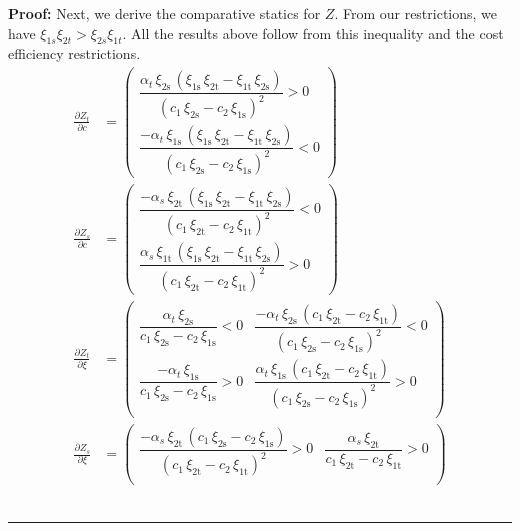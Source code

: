 \documentclass[11pt,a4paper,leqno]{extarticle}
\newenvironment{proof}[1][Proof]{\noindent\textbf{#1:} }{\ \rule{0.5em}{0.5em}}
\begin{document}
\begin{proof}
		Next, we derive the comparative statics for $Z$. From our restrictions, we have $\xi_{1s}\xi_{2t} > \xi_{2s}\xi_{1t}$. All the results above follow from this inequality and the cost efficiency restrictions. 
		\begin{align*}
		\frac{\partial Z_t}{\partial c} &= 
		\begin{pmatrix}
		\dfrac{\alpha _{t}\,\xi _{\mathrm{2s}}\,\left(\xi _{\mathrm{1s}}\,\xi _{\mathrm{2t}}-\xi _{\mathrm{1t}}\,\xi _{\mathrm{2s}}\right)}{{\left(c_{1}\,\xi _{\mathrm{2s}}-c_{2}\,\xi _{\mathrm{1s}}\right)}^2}>0\\
		\dfrac{-\alpha _{t}\,\xi _{\mathrm{1s}}\,\left(\xi _{\mathrm{1s}}\,\xi _{\mathrm{2t}}-\xi _{\mathrm{1t}}\,\xi _{\mathrm{2s}}\right)}{{\left(c_{1}\,\xi _{\mathrm{2s}}-c_{2}\,\xi _{\mathrm{1s}}\right)}^2}<0
		\end{pmatrix}\\
		\frac{\partial Z_s}{\partial c} &= 
		\begin{pmatrix}
		\dfrac{-\alpha _{s}\,\xi _{\mathrm{2t}}\,\left(\xi _{\mathrm{1s}}\,\xi _{\mathrm{2t}}-\xi _{\mathrm{1t}}\,\xi _{\mathrm{2s}}\right)}{{\left(c_{1}\,\xi _{\mathrm{2t}}-c_{2}\,\xi _{\mathrm{1t}}\right)}^2} <0\\
		\dfrac{\alpha _{s}\,\xi _{\mathrm{1t}}\,\left(\xi _{\mathrm{1s}}\,\xi _{\mathrm{2t}}-\xi _{\mathrm{1t}}\,\xi _{\mathrm{2s}}\right)}{{\left(c_{1}\,\xi _{\mathrm{2t}}-c_{2}\,\xi _{\mathrm{1t}}\right)}^2} >0
		\end{pmatrix}\\
		\frac{\partial Z_t}{\partial \xi} &= 
		\begin{pmatrix}
		\dfrac{\alpha _{t}\,\xi _{\mathrm{2s}}}{c_{1}\,\xi _{\mathrm{2s}}-c_{2}\,\xi _{\mathrm{1s}}} < 0& \dfrac{-\alpha _{t}\,\xi _{\mathrm{2s}}\,\left(c_{1}\,\xi _{\mathrm{2t}}-c_{2}\,\xi _{\mathrm{1t}}\right)}{{\left(c_{1}\,\xi _{\mathrm{2s}}-c_{2}\,\xi _{\mathrm{1s}}\right)}^2} <0 \\
		\dfrac{-\alpha _{t}\,\xi _{\mathrm{1s}}}{c_{1}\,\xi _{\mathrm{2s}}-c_{2}\,\xi _{\mathrm{1s}}} >0& \dfrac{\alpha _{t}\,\xi _{\mathrm{1s}}\,\left(c_{1}\,\xi _{\mathrm{2t}}-c_{2}\,\xi _{\mathrm{1t}}\right)}{{\left(c_{1}\,\xi _{\mathrm{2s}}-c_{2}\,\xi _{\mathrm{1s}}\right)}^2} >0\\
		\end{pmatrix}\\
		\frac{\partial Z_s}{\partial \xi} &= 
		\begin{pmatrix}
		\dfrac{-\alpha _{s}\,\xi _{\mathrm{2t}}\,\left(c_{1}\,\xi _{\mathrm{2s}}-c_{2}\,\xi _{\mathrm{1s}}\right)}{{\left(c_{1}\,\xi _{\mathrm{2t}}-c_{2}\,\xi _{\mathrm{1t}}\right)}^2}> 0& \dfrac{\alpha _{s}\,\xi _{\mathrm{2t}}}{c_{1}\,\xi _{\mathrm{2t}}-c_{2}\,\xi _{\mathrm{1t}}} > 0\\

\end{pmatrix}
\end{align*}
\end{proof}
\end{document}
